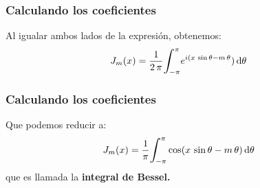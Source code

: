 \documentclass[12pt]{beamer}
\begin{document}
\begin{frame}
\frametitle{Calculando los coeficientes}
Al igualar ambos lados de la expresión, obtenemos:
\pause
\begin{equation}
J_{m} (x) = \dfrac{1}{2 \, \pi} \scaleint{6ex}_{\bs -\pi}^{\pi} e^{i (x \, \sin \theta -  m \, \theta}) \dd{\theta}
\label{eq:ecuacion_27_30}
\end{equation}
\end{frame}
\begin{frame}
\frametitle{Calculando los coeficientes}
Que podemos reducir a:
\pause
\begin{equation}
J_{m} (x) = \dfrac{1}{\pi} \scaleint{6ex}_{\bs -\pi}^{\pi} \cos (x \, \sin \theta -  m \, \theta) \dd{\theta}
\label{eq:ecuacion_27_31}
\end{equation}
que es llamada la \textbf{integral de Bessel.}
\end{frame}
\end{document}
